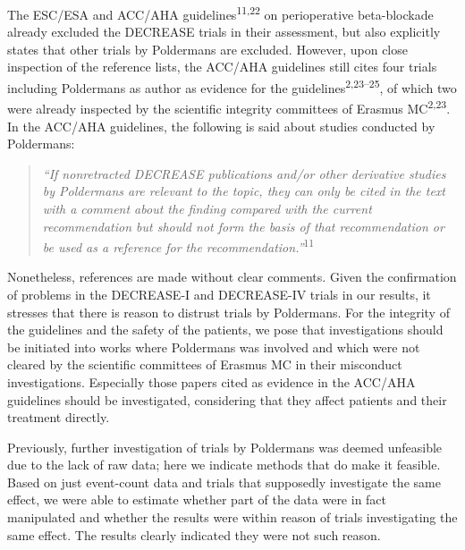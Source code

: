 \documentclass[]{article}
\begin{document}
The ESC/ESA and ACC/AHA guidelines\textsuperscript{11,22} on
perioperative beta-blockade already excluded the DECREASE trials in
their assessment, but also explicitly states that other trials by
Poldermans are excluded. However, upon close inspection of the reference
lists, the ACC/AHA guidelines still cites four trials including
Poldermans as author as evidence for the
guidelines\textsuperscript{2,23--25}, of which two were already
inspected by the scientific integrity committees of Erasmus
MC\textsuperscript{2,23}. In the ACC/AHA guidelines, the following is
said about studies conducted by Poldermans:

\begin{quote}
\emph{``If nonretracted DECREASE publications and/or other derivative
studies by Poldermans are relevant to the topic, they can only be cited
in the text with a comment about the finding compared with the current
recommendation but should not form the basis of that recommendation or
be used as a reference for the recommendation.''}\textsuperscript{11}
\end{quote}

Nonetheless, references are made without clear comments. Given the
confirmation of problems in the DECREASE-I and DECREASE-IV trials in our
results, it stresses that there is reason to distrust trials by
Poldermans. For the integrity of the guidelines and the safety of the
patients, we pose that investigations should be initiated into works
where Poldermans was involved and which were not cleared by the
scientific committees of Erasmus MC in their misconduct investigations.
Especially those papers cited as evidence in the ACC/AHA guidelines
should be investigated, considering that they affect patients and their
treatment directly.

Previously, further investigation of trials by Poldermans was deemed
unfeasible due to the lack of raw data; here we indicate methods that do
make it feasible. Based on just event-count data and trials that
supposedly investigate the same effect, we were able to estimate whether
part of the data were in fact manipulated and whether the results were
within reason of trials investigating the same effect. The results
clearly indicated they were not such reason.
\end{document}
